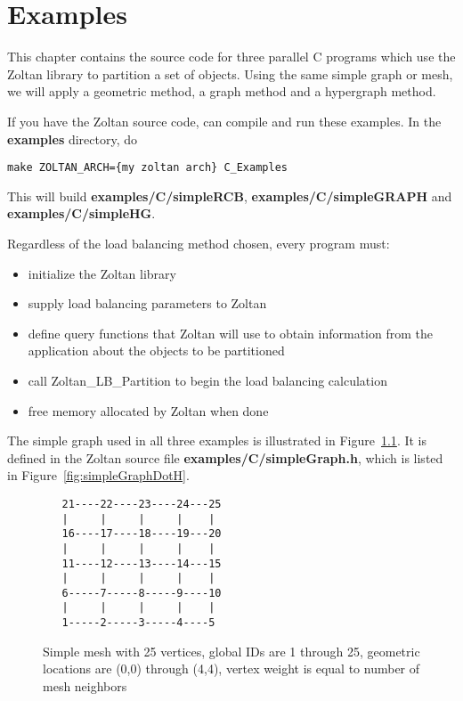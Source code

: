 %
%
\chapter{Examples}

This chapter contains the source code for three parallel C programs 
which use the Zoltan library to partition a set of objects.  Using
the same simple graph or mesh, we will apply a geometric method,
a graph method and a hypergraph method.

If you have the Zoltan source code, can compile and run these examples.
In the \textbf{examples} directory, do

\begin{verbatim}
make ZOLTAN_ARCH={my zoltan arch} C_Examples
\end{verbatim}

This will build \textbf{examples/C/simpleRCB},
\textbf{examples/C/simpleGRAPH} and
\textbf{examples/C/simpleHG}.

Regardless of the load balancing method chosen, every program must:

\begin{itemize}
\item initialize the Zoltan library
\item supply load balancing parameters to Zoltan
\item define query functions that Zoltan will use to obtain information from the application about the objects to be partitioned
\item call Zoltan\_LB\_Partition to begin the load balancing calculation
\item free memory allocated by Zoltan when done
\end{itemize}

The simple graph used in all three examples is illustrated
in Figure~\ref{fig:simpleGraph}.
It is defined in the Zoltan source file \textbf{examples/C/simpleGraph.h},
which is listed in Figure~\ref{fig:simpleGraphDotH}.

\begin{figure}[bottom]
\begin{center}
\begin{verbatim}
   21----22----23----24---25
   |     |     |     |    |
   16----17----18----19---20
   |     |     |     |    |
   11----12----13----14---15
   |     |     |     |    |
   6-----7-----8-----9----10
   |     |     |     |    |
   1-----2-----3-----4----5
\end{verbatim}
\caption{Simple mesh with 25 vertices, global IDs are 1 through 25, geometric locations are (0,0) through (4,4), vertex weight is equal to number of mesh neighbors}
\end{center}
\label{fig:simpleGraph}
\end{figure}

